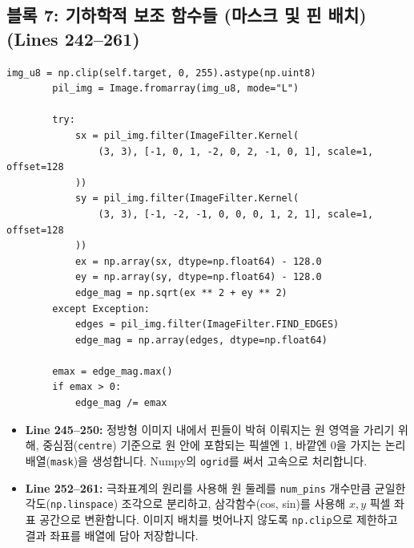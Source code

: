 \subsection*{블록 7: 기하학적 보조 함수들 (마스크 및 핀 배치) (Lines 242--261)}
\begin{lstlisting}[firstnumber=242]
        img_u8 = np.clip(self.target, 0, 255).astype(np.uint8)
        pil_img = Image.fromarray(img_u8, mode="L")

        try:
            sx = pil_img.filter(ImageFilter.Kernel(
                (3, 3), [-1, 0, 1, -2, 0, 2, -1, 0, 1], scale=1, offset=128
            ))
            sy = pil_img.filter(ImageFilter.Kernel(
                (3, 3), [-1, -2, -1, 0, 0, 0, 1, 2, 1], scale=1, offset=128
            ))
            ex = np.array(sx, dtype=np.float64) - 128.0
            ey = np.array(sy, dtype=np.float64) - 128.0
            edge_mag = np.sqrt(ex ** 2 + ey ** 2)
        except Exception:
            edges = pil_img.filter(ImageFilter.FIND_EDGES)
            edge_mag = np.array(edges, dtype=np.float64)

        emax = edge_mag.max()
        if emax > 0:
            edge_mag /= emax
\end{lstlisting}
\begin{itemize}
\item \textbf{Line 245--250:} 정방형 이미지 내에서 핀들이 박혀 이뤄지는 원 영역을 가리기 위해, 중심점(\texttt{centre}) 기준으로 원 안에 포함되는 픽셀엔 1, 바깥엔 0을 가지는 논리 배열(\texttt{mask})을 생성합니다. Numpy의 \texttt{ogrid}를 써서 고속으로 처리합니다.
\item \textbf{Line 252--261:} 극좌표계의 원리를 사용해 원 둘레를 \texttt{num\_pins} 개수만큼 균일한 각도(\texttt{np.linspace}) 조각으로 분리하고, 삼각함수(cos, sin)를 사용해 \(x, y\) 픽셀 좌표 공간으로 변환합니다. 이미지 배치를 벗어나지 않도록 \texttt{np.clip}으로 제한하고 결과 좌표를 배열에 담아 저장합니다.
\end{itemize}

